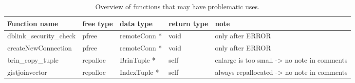 \begin{table}[h]
\centering
\begin{tabularx}{\linewidth}{}
Function name & free type & data type & return type & note\\
\hline
dblink_security_check & pfree & remoteConn *& void & only after ERROR\\
createNewConnection & pfree & remoteConn *& void & only after ERROR\\
brin_copy_tuple & repalloc & BrinTuple *&self&enlarge is too small -> no note in comments\\
gistjoinvector & repalloc & IndexTuple *&self&always repallocated -> no note in comments\\
\end{tabularx}
\caption{Overview of functions that may have problematic uses.}
\label{tab:overview:functions:pfree_repalloc}
\end{table}
